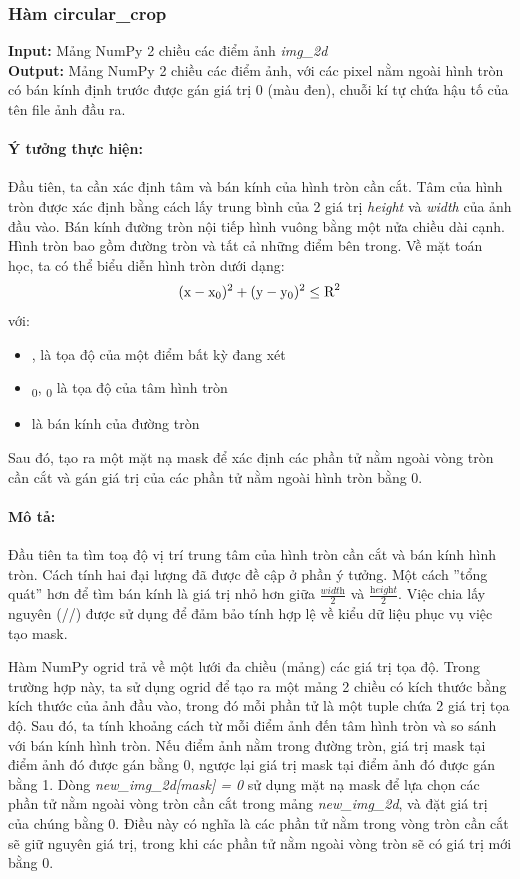 \documentclass[]{article}
\begin{document}
\subsubsection{Hàm circular\_crop}
\textbf{Input:} Mảng NumPy 2 chiều các điểm ảnh \textit{img\_2d} \\
\textbf{Output:} Mảng NumPy 2 chiều các điểm ảnh, với các pixel nằm ngoài hình tròn có bán kính định trước được gán giá trị 0 (màu đen), chuỗi kí tự chứa hậu tố của tên file ảnh đầu ra.
\paragraph{Ý tưởng thực hiện:} Đầu tiên, ta cần xác định tâm và bán kính của hình tròn cần cắt. Tâm của hình tròn được xác định bằng cách lấy trung bình của 2 giá trị \textit{height} và \textit{width} của ảnh đầu vào. Bán kính đường tròn nội tiếp hình vuông bằng một nửa chiều dài cạnh. Hình tròn bao gồm đường tròn và tất cả những điểm bên trong. Về mặt toán học, ta có thể biểu diễn hình tròn dưới dạng:
\[ (\text{x} - \text{x}\textsubscript 0)^2 + (\text{y} - \text{y}\textsubscript 0)^2 \leq \text{R}^2\]
với: 
\begin{itemize}
  \item {},  là tọa độ của một điểm bất kỳ đang xét
  \item {}\textsubscript 0, \textsubscript 0 là tọa độ của tâm hình tròn
  \item {} là bán kính của đường tròn
\end{itemize}
Sau đó, tạo ra một mặt nạ mask để xác định các phần tử nằm ngoài vòng tròn cần cắt và gán giá trị của các phần tử nằm ngoài hình tròn bằng 0.
\paragraph{Mô tả:} Đầu tiên ta tìm toạ độ vị trí trung tâm của hình tròn cần cắt và bán kính hình tròn. Cách tính hai đại lượng đã được đề cập ở phần ý tưởng. Một cách ''tổng quát'' hơn để tìm bán kính là giá trị nhỏ hơn giữa $\frac{\textit{width}}{2}$ và $\frac{\textit{height}}{2}$. Việc chia lấy nguyên (//) được sử dụng để đảm bảo tính hợp lệ về kiểu dữ liệu phục vụ việc tạo mask.

Hàm NumPy ogrid trả về một lưới đa chiều (mảng) các giá trị tọa độ. Trong trường hợp này, ta sử dụng ogrid để tạo ra một mảng 2 chiều có kích thước bằng kích thước của ảnh đầu vào, trong đó mỗi phần tử là một tuple chứa 2 giá trị tọa độ. Sau đó, ta tính khoảng cách từ mỗi điểm ảnh đến tâm hình tròn và so sánh với bán kính hình tròn. Nếu điểm ảnh nằm trong đường tròn, giá trị mask tại điểm ảnh đó được gán bằng 0, ngược lại giá trị mask tại điểm ảnh đó được gán bằng 1. Dòng \textit{new\_img\_2d[mask] = 0} sử dụng mặt nạ mask để lựa chọn các phần tử nằm ngoài vòng tròn cần cắt trong mảng \textit{new\_img\_2d}, và đặt giá trị của chúng bằng 0. Điều này có nghĩa là các phần tử nằm trong vòng tròn cần cắt sẽ giữ nguyên giá trị, trong khi các phần tử nằm ngoài vòng tròn sẽ có giá trị mới bằng 0.
\end{document}
